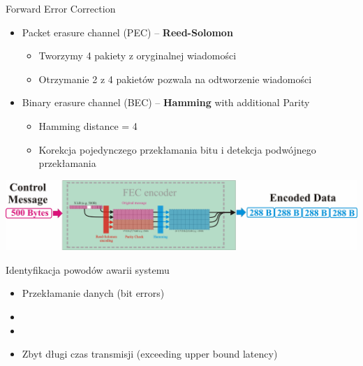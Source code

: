 \documentclass[compress,red]{beamer}
\begin{document}
\begin{frame}{Forward Error Correction}

      \begin{itemize}
	\item Packet erasure channel (PEC) -- {\bf Reed-Solomon}
	\begin{itemize}
	  \item Tworzymy 4 pakiety z oryginalnej wiadomości
	  \item Otrzymanie 2 z 4 pakietów pozwala na odtworzenie wiadomości
	\end{itemize}
	\item Binary erasure channel (BEC) -- {\bf Hamming} with additional Parity
	\begin{itemize}
	  \item Hamming distance = 4
	  \item Korekcja pojedynczego przekłamania bitu i detekcja podwójnego przekłamania
	\end{itemize}    
      \end{itemize}


      \begin{center}
      \includegraphics[width=1.0\textwidth]{robustness/FECencoder.pdf}
      \end{center}

\end{frame}
\begin{frame}{Identyfikacja powodów awarii systemu}


  \begin{itemize}
    \item Przekłamanie danych (bit errors)
    \item  {}
    \item \color{black}{Awaria elementów sieci (element failure)}
    \item Zbyt długi czas transmisji (exceeding upper bound latency)
  \end{itemize}

\end{frame}
\end{document}
